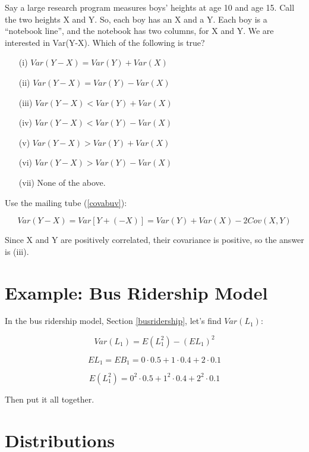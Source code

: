 Say a large research program measures boys' heights at age
10 and age 15.  Call the two heights X and Y.  So, each boy has an X
and a Y.  Each boy is a ``notebook line'', and the notebook has two
columns, for X and Y.  We are interested in Var(Y-X).  Which of the
following is true?

\begin{itemize}

\item [(i)] $Var(Y-X) = Var(Y) + Var(X)$
\item [(ii)] $Var(Y-X) = Var(Y) - Var(X)$
\item [(iii)] $Var(Y-X) < Var(Y) + Var(X)$
\item [(iv)] $Var(Y-X) < Var(Y) - Var(X)$
\item [(v)] $Var(Y-X) > Var(Y) + Var(X)$
\item [(vi)] $Var(Y-X) > Var(Y) - Var(X)$
\item [(vii)] None of the above.

\end{itemize}

Use the mailing tube (\ref{covabuv}):

\begin{equation}
Var(Y-X) = Var[Y+(-X)] = 
Var(Y) + Var(X) - 2Cov(X,Y)
\end{equation}

Since X and Y are positively correlated, their covariance is positive,
so the answer is (iii).

\section{Example:  Bus Ridership Model}

In the bus ridership model, Section \ref{busridership}, let's find
$Var(L_1)$:

\begin{equation}
Var(L_1) = E(L^2_1) - (EL_1)^2
\end{equation}

\begin{equation}
EL_1 = EB_1 = 0 \cdot 0.5 + 1 \cdot 0.4 + 2 \cdot 0.1
\end{equation}

\begin{equation}
E(L^2_1) = 0^2 \cdot 0.5 + 1^2 \cdot 0.4 + 2^2 \cdot 0.1
\end{equation}

Then put it all together.

\section{Distributions}
\label{dstrdef}


